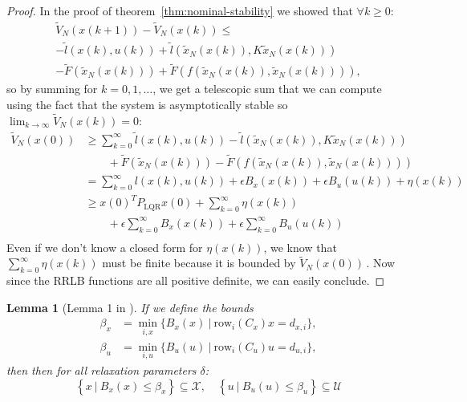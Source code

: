 \documentclass[conference]{IEEEtran}
\newtheorem{lemma}[theorem]{Lemma}
\theoremstyle{definition}
\theoremstyle{remark}
\def\cal#1{\mathcal{#1}}
\def\rm#1{\mathrm{#1}}
\begin{document}
\begin{proof}
	In the proof of theorem~\ref{thm:nominal-stability} we showed that $\forall k\geq 0$:
	\begin{multline*}
		\tilde{V}_N(x(k+1))-\tilde{V}_N(x(k))\leq\\
		-\tilde{l}(x(k),u(k))+\tilde{l}(\tilde{x}_N(x(k)), K\tilde{x}_N(x(k)))\\
		-\tilde{F}(\tilde{x}_N(x(k)))+\tilde{F}(f(\tilde{x}_N(x(k)),\tilde{x}_N(x(k)))),
	\end{multline*}
	so by summing for $k=0,1,\dots$, we get a telescopic sum that we can compute using the fact that the system is asymptotically stable so $\lim_{k\to\infty}\tilde{V}_N(x(k))=0$:
	\begin{align*}
		\tilde{V}_N(x(0))&\geq\sum_{k=0}^\infty\tilde{l}(x(k),u(k))-\tilde{l}(\tilde{x}_N(x(k)), K\tilde{x}_N(x(k)))\\
		&\qquad+\tilde{F}(\tilde{x}_N(x(k)))-\tilde{F}(f(\tilde{x}_N(x(k)),\tilde{x}_N(x(k))))\\
		&=\sum_{k=0}^\infty l(x(k), u(k))+\epsilon B_x(x(k))+\epsilon B_u(u(k))+\eta(x(k))\\
		&\geq x(0)^TP_{\rm{LQR}}x(0)+\sum_{k=0}^\infty\eta(x(k))\\
		&\qquad+\epsilon\sum_{k=0}^\infty B_x(x(k))+\epsilon\sum_{k=0}^\infty B_u(u(k))\\
	\end{align*}
	Even if we don't know a closed form for $\eta(x(k))$, we know that $\sum_{k=0}^\infty\eta(x(k))$ must be finite because it is bounded by $\tilde{V}_N(x(0))$\,.
	Now since the RRLB functions are all positive definite, we can easily conclude.
\end{proof}


\begin{lemma}[Lemma 1 in \cite{RRLB-linear-MPC}]
	\label{thm:constraint-set-def-with-RRLB}
	If we define the bounds 
	\begin{align*}
		\beta_x&=\underset{i,x}{\min}\{B_x(x)~|~\rm{row}_i(C_x)x=d_{x,i}\},\\
		\beta_u&=\underset{i,u}{\min}\{B_u(u)~|~\rm{row}_i(C_u)u=d_{u,i}\},
	\end{align*}
	then then for all relaxation parameters $\delta$:
	\begin{equation}
		\left\{x~|~B_x(x)\leq\beta_x\right\}\subseteq\cal{X},\quad\left\{u~|~B_u(u)\leq\beta_u\right\}\subseteq\cal{U}
	\end{equation}
\end{lemma}
\end{document}
